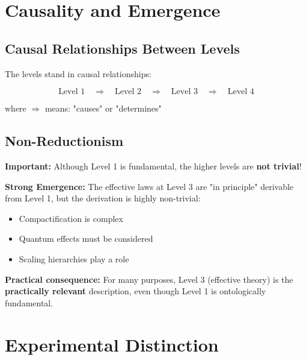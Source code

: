 	\section{Causality and Emergence}
	
	\subsection{Causal Relationships Between Levels}
	
	The levels stand in causal relationships:
	
	\begin{equation}
		\text{Level 1} \quad \Rightarrow \quad \text{Level 2} \quad \Rightarrow \quad \text{Level 3} \quad \Rightarrow \quad \text{Level 4}
	\end{equation}
	
	where $\Rightarrow$ means: "causes" or "determines"
	
	\subsection{Non-Reductionism}
	
	\begin{philosophical}
		\textbf{Important:} Although Level 1 is fundamental, the higher levels are \textbf{not trivial}!
		
		\vspace{0.3cm}
		
		\textbf{Strong Emergence:}
		The effective laws at Level 3 are "in principle" derivable from Level 1, but the derivation is highly non-trivial:
		\begin{itemize}
			\item Compactification is complex
			\item Quantum effects must be considered
			\item Scaling hierarchies play a role
		\end{itemize}
		
		\vspace{0.3cm}
		
		\textbf{Practical consequence:}
		For many purposes, Level 3 (effective theory) is the \textbf{practically relevant} description, even though Level 1 is ontologically fundamental.
	\end{philosophical}
	
	\section{Experimental Distinction}
	
